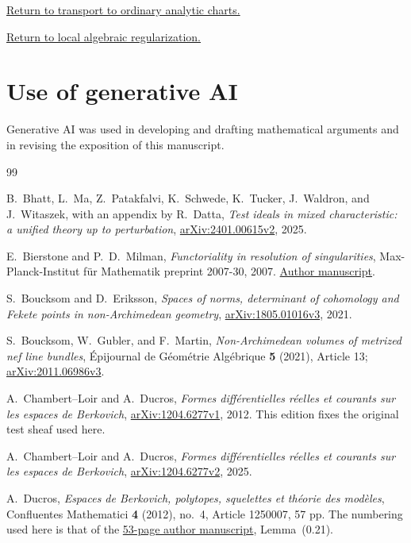 \documentclass[11pt,reqno]{amsart}
\theoremstyle{definition}
\theoremstyle{remark}
\numberwithin{equation}{section}
\newcommand{\returnlink}[2]{\par\smallskip\noindent
\hyperref[#1]{\textcolor{ReturnLink}{Return to #2.}}\par}
\begin{document}
\returnlink{prop:ordinary-transport}{transport to ordinary analytic charts}
\returnlink{prop:local-algebraic-regularization}{local algebraic regularization}


\section*{Use of generative AI}
Generative AI was used in developing and drafting mathematical arguments
and in revising the exposition of this manuscript.

\begin{thebibliography}{99}
\raggedright

B.~Bhatt, L.~Ma, Z.~Patakfalvi, K.~Schwede, K.~Tucker,
J.~Waldron, and J.~Witaszek, with an appendix by R.~Datta,
\emph{Test ideals in mixed characteristic: a unified theory up to perturbation},
\href{https://arxiv.org/abs/2401.00615v2}{arXiv:2401.00615v2}, 2025.

E.~Bierstone and P.~D.~Milman,
\emph{Functoriality in resolution of singularities},
Max-Planck-Institut f\"ur Mathematik preprint 2007-30, 2007.
\href{https://archive.mpim-bonn.mpg.de/2624/1/preprint_2007_30.pdf}{Author manuscript}.

S.~Boucksom and D.~Eriksson,
\emph{Spaces of norms, determinant of cohomology and Fekete points
in non-Archimedean geometry},
\href{https://arxiv.org/abs/1805.01016v3}{arXiv:1805.01016v3}, 2021.

S.~Boucksom, W.~Gubler, and F.~Martin,
\emph{Non-Archimedean volumes of metrized nef line bundles},
\'Epijournal de G\'eom\'etrie Alg\'ebrique \textbf{5} (2021), Article 13;
\href{https://arxiv.org/abs/2011.06986v3}{arXiv:2011.06986v3}.

A.~Chambert--Loir and A.~Ducros,
\emph{Formes diff\'erentielles r\'eelles et courants sur les espaces de Berkovich},
\href{https://arxiv.org/abs/1204.6277v1}{arXiv:1204.6277v1}, 2012.
This edition fixes the original test sheaf used here.

A.~Chambert--Loir and A.~Ducros,
\emph{Formes diff\'erentielles r\'eelles et courants sur les espaces de Berkovich},
\href{https://arxiv.org/abs/1204.6277v2}{arXiv:1204.6277v2}, 2025.

A.~Ducros,
\emph{Espaces de Berkovich, polytopes, squelettes et th\'eorie des mod\`eles},
Confluentes Mathematici \textbf{4} (2012), no.~4, Article 1250007,
57 pp. The numbering used here is that of the
\href{https://webusers.imj-prg.fr/~antoine.ducros/tropicbis.pdf}{53-page author manuscript},
Lemma~(0.21).


\end{thebibliography}
\end{document}
